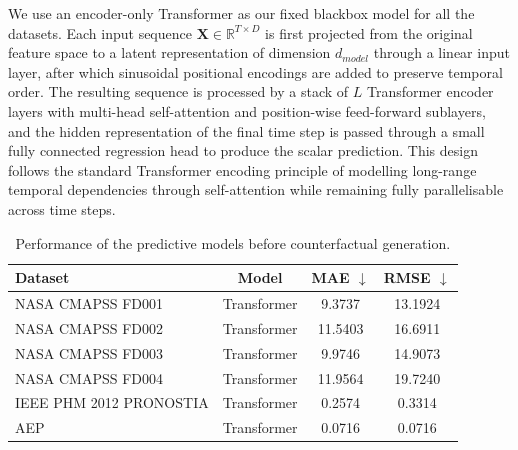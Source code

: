 \documentclass[runningheads]{llncs}
\begin{document}
	We use an encoder-only Transformer as our fixed blackbox model for all the datasets. Each input sequence $\mathbf{X} \in \mathbb{R}^{T \times D}$ is first projected from the original feature space to a latent representation of dimension $d_{model}$ through a linear input layer, after which sinusoidal positional encodings are added to preserve temporal order. The resulting sequence is processed by a stack of $L$ Transformer encoder layers with multi-head self-attention and position-wise feed-forward sublayers, and the hidden representation of the final time step is passed through a small fully connected regression head to produce the scalar prediction. This design follows the standard Transformer encoding principle of modelling long-range temporal dependencies through self-attention while remaining fully parallelisable across time steps.
	
	
	\begin{table}[t]
		\centering
		\caption{Performance of the predictive models before counterfactual generation.}
		\label{tab:predictive_performance}
		\begin{tabular}{lccc}
			\toprule
			Dataset & Model & MAE $\downarrow$ & RMSE $\downarrow$  \\
			\midrule
			NASA CMAPSS FD001 & Transformer & 9.3737 & 13.1924  \\
			NASA CMAPSS FD002 & Transformer & 11.5403 & 16.6911 \\
			NASA CMAPSS FD003 & Transformer & 9.9746 & 14.9073  \\
			NASA CMAPSS FD004 & Transformer & 11.9564 & 19.7240  \\
			IEEE PHM 2012 PRONOSTIA & Transformer & 0.2574 & 0.3314  \\
			AEP & Transformer & 0.0716 & 0.0716  \\
			\bottomrule
		\end{tabular}
	\end{table}
	
	
	
	
	
	
	
	
	
\end{document}

